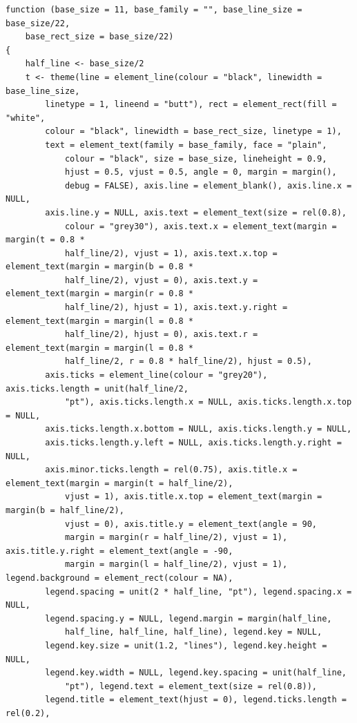 \documentclass[
  letterpaper,
]{scrbook}
\begin{document}
\begin{verbatim}
function (base_size = 11, base_family = "", base_line_size = base_size/22, 
    base_rect_size = base_size/22) 
{
    half_line <- base_size/2
    t <- theme(line = element_line(colour = "black", linewidth = base_line_size, 
        linetype = 1, lineend = "butt"), rect = element_rect(fill = "white", 
        colour = "black", linewidth = base_rect_size, linetype = 1), 
        text = element_text(family = base_family, face = "plain", 
            colour = "black", size = base_size, lineheight = 0.9, 
            hjust = 0.5, vjust = 0.5, angle = 0, margin = margin(), 
            debug = FALSE), axis.line = element_blank(), axis.line.x = NULL, 
        axis.line.y = NULL, axis.text = element_text(size = rel(0.8), 
            colour = "grey30"), axis.text.x = element_text(margin = margin(t = 0.8 * 
            half_line/2), vjust = 1), axis.text.x.top = element_text(margin = margin(b = 0.8 * 
            half_line/2), vjust = 0), axis.text.y = element_text(margin = margin(r = 0.8 * 
            half_line/2), hjust = 1), axis.text.y.right = element_text(margin = margin(l = 0.8 * 
            half_line/2), hjust = 0), axis.text.r = element_text(margin = margin(l = 0.8 * 
            half_line/2, r = 0.8 * half_line/2), hjust = 0.5), 
        axis.ticks = element_line(colour = "grey20"), axis.ticks.length = unit(half_line/2, 
            "pt"), axis.ticks.length.x = NULL, axis.ticks.length.x.top = NULL, 
        axis.ticks.length.x.bottom = NULL, axis.ticks.length.y = NULL, 
        axis.ticks.length.y.left = NULL, axis.ticks.length.y.right = NULL, 
        axis.minor.ticks.length = rel(0.75), axis.title.x = element_text(margin = margin(t = half_line/2), 
            vjust = 1), axis.title.x.top = element_text(margin = margin(b = half_line/2), 
            vjust = 0), axis.title.y = element_text(angle = 90, 
            margin = margin(r = half_line/2), vjust = 1), axis.title.y.right = element_text(angle = -90, 
            margin = margin(l = half_line/2), vjust = 1), legend.background = element_rect(colour = NA), 
        legend.spacing = unit(2 * half_line, "pt"), legend.spacing.x = NULL, 
        legend.spacing.y = NULL, legend.margin = margin(half_line, 
            half_line, half_line, half_line), legend.key = NULL, 
        legend.key.size = unit(1.2, "lines"), legend.key.height = NULL, 
        legend.key.width = NULL, legend.key.spacing = unit(half_line, 
            "pt"), legend.text = element_text(size = rel(0.8)), 
        legend.title = element_text(hjust = 0), legend.ticks.length = rel(0.2), 

\end{verbatim}
\end{document}
